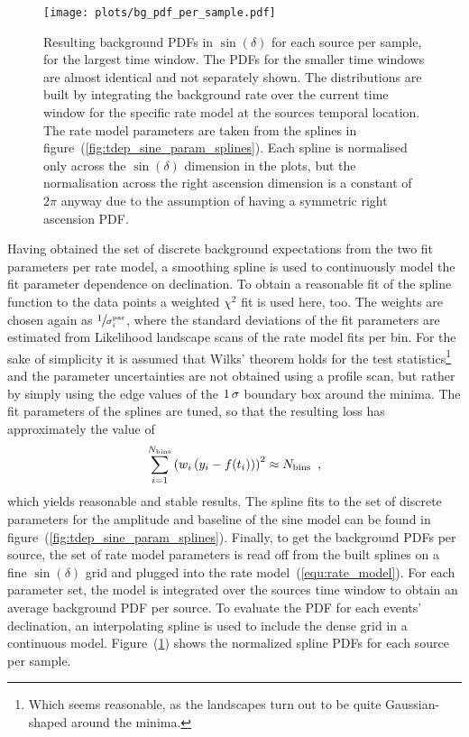 \begin{figure}[htbp]
  \centering
  \texttt{[image: plots/bg\_pdf\_per\_sample.pdf]}
  \caption[Background PDFs per source per sample for the time-dependent analysis]{
    Resulting background PDFs in $\sin(\delta)$ for each source per sample, for the largest time window.
    The PDFs for the smaller time windows are almost identical and not separately shown.
    The distributions are built by integrating the background rate over the current time window for the specific rate model at the sources temporal location.
    The rate model parameters are taken from the splines in figure~(\ref{fig:tdep_sine_param_splines}).
    Each spline is normalised only across the $\sin(\delta)$ dimension in the plots, but the normalisation across the right ascension dimension is a constant of $2\pi$ anyway due to the assumption of having a symmetric right ascension PDF.
  }
  \label{fig:tdep_bg_pdf_per_sample}
\end{figure}

Having obtained the set of discrete background expectations from the two fit parameters per rate model, a smoothing spline is used to continuously model the fit parameter dependence on declination.
To obtain a reasonable fit of the spline function to the data points a weighted $\chi^2$ fit is used here, too.
The weights are chosen again as $\sfrac{1}{\sigma_i^\text{par}}$, where the standard deviations of the fit parameters are estimated from Likelihood landscape scans of the rate model fits per bin.
For the sake of simplicity it is assumed that Wilks' theorem holds for the test statistics\footnote{Which seems reasonable, as the landscapes turn out to be quite Gaussian-shaped around the minima.} and the parameter uncertainties are not obtained using a profile scan, but rather by simply using the edge values of the $\num{1}\,\sigma$ boundary box around the minima.
The fit parameters of the splines are tuned, so that the resulting loss has approximately the value of
\begin{equation}
  \sum_{i=1}^{N_\text{bins}} \left(w_i\left(y_i - f(t_i)\right)\right)^2
  \approx N_\text{bins}
  \enspace\text{,}
\end{equation}
which yields reasonable and stable results.
The spline fits to the set of discrete parameters for the amplitude and baseline of the sine model can be found in figure~(\ref{fig:tdep_sine_param_splines}).
Finally, to get the background PDFs per source, the set of rate model parameters is read off from the built splines on a fine $\sin(\delta)$ grid and plugged into the rate model~(\ref{equ:rate_model}).
For each parameter set, the model is integrated over the sources time window to obtain an average background PDF per source.
To evaluate the PDF for each events' declination, an interpolating spline is used to include the dense grid in a continuous model.
Figure~(\ref{fig:tdep_bg_pdf_per_sample}) shows the normalized spline PDFs for each source per sample.

